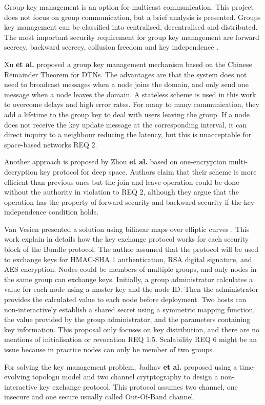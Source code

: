 Group key management is an option for multicast communication. This project does not focus on group communication, but a brief analysis is presented. Groups key management can be classified into centralised, decentralised and distributed. The most important security requirement for group key management are forward secrecy, backward secrecy, collusion freedom and key independence \cite{camtepe2005key}. 

Xu \textbf{et al.} \cite{xu2012chinese} proposed a group key management mechanism based on the Chinese Remainder Theorem for DTNs. The advantages are that the system does not need to broadcast messages when a node joins the domain, and only send one message when a node leaves the domain. A stateless scheme is used in this work to overcome delays and high error rates. For many to many communication, they add a lifetime to the group key to deal with users leaving the group. If a node does not receive the key update message at the corresponding interval, it can direct inquiry to a neighbour reducing the latency, but this is unacceptable for space-based networks REQ 2.

Another approach is proposed by Zhou \textbf{et al.} \cite{zhou2014autonomic} based on one-encryption multi-decryption key protocol for deep space. Authors claim that their scheme is more efficient than previous ones but the join and leave operation could be done without the authority in violation to REQ 2, although they argue that the operation has the property of forward-security and backward-security if the key independence condition holds. 


Van Vesien presented a solution using bilinear maps over elliptic curves \cite{van2010dynamic}. This work explain in details how the key exchange protocol works for each security block of the Bundle protocol. The author assumed that the protocol will be used to exchange keys for HMAC-SHA 1 authentication, RSA digital signature, and AES encryption. Nodes could be members of multiple groups, and only nodes in the same group can exchange keys. Initially, a group administrator calculates a value for each node using a master key and the node ID. Then the administrator provides the calculated value to each node before deployment. Two hosts can non-interactively establish a shared secret using a symmetric mapping function, the value provided by the group administrator, and the parameters containing key information. This proposal only focuses on key distribution, and there are no mentions of initialisation or revocation REQ 1,5. Scalability REQ 6 might be an issue because in practice nodes can only be member of two groups. 


For solving the key management problem, Jadhav \textbf{et al.} proposed using a time-evolving topologu model and two channel crytptography to design a non-interactive key exchange protocol. This protocol assumes two channel, one insecure and one secure usually called Out-Of-Band channel. 